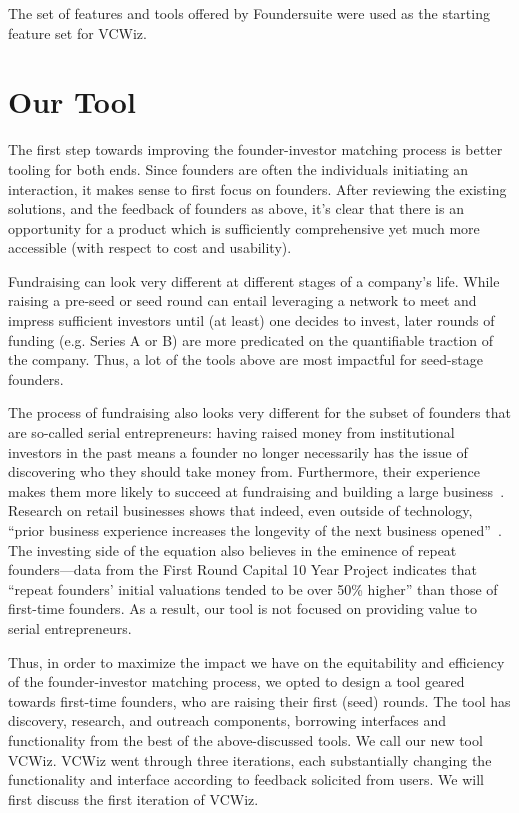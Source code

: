 The set of features and tools offered by Foundersuite were used as the starting feature set for VCWiz.

\section{Our Tool}
\label{chap3:tool}

The first step towards improving the founder-investor matching process is better tooling for both ends. Since founders are often the individuals initiating an interaction, it makes sense to first focus on founders. After reviewing the existing solutions, and the feedback of founders as above, it's clear that there is an opportunity for a product which is sufficiently comprehensive yet much more accessible (with respect to cost and usability).

Fundraising can look very different at different stages of a company's life. While raising a pre-seed or seed round can entail leveraging a network to meet and impress sufficient investors until (at least) one decides to invest, later rounds of funding (e.g. Series A or B) are more predicated on the quantifiable traction of the company. Thus, a lot of the tools above are most impactful for seed-stage founders.

The process of fundraising also looks very different for the subset of founders that are so-called serial entrepreneurs: having raised money from institutional investors in the past means a founder no longer necessarily has the issue of discovering who they should take money from. Furthermore, their experience makes them more likely to succeed at fundraising and building a large business~\cite{gompers2010performance}. Research on retail businesses shows that indeed, even outside of technology, ``prior business experience increases the longevity of the next business opened''~\cite{doi:10.1086/683820}. The investing side of the equation also believes in the eminence of repeat founders---data from the First Round Capital 10 Year Project \cite{first-round-10-years} indicates that ``repeat founders' initial valuations tended to be over 50\% higher'' than those of first-time founders. As a result, our tool is not focused on providing value to serial entrepreneurs.

Thus, in order to maximize the impact we have on the equitability and efficiency of the founder-investor matching process, we opted to design a tool geared towards first-time founders, who are raising their first (seed) rounds. The tool has discovery, research, and outreach components, borrowing interfaces and functionality from the best of the above-discussed tools. We call our new tool VCWiz. VCWiz went through three iterations, each substantially changing the functionality and interface according to feedback solicited from users. We will first discuss the first iteration of VCWiz.


